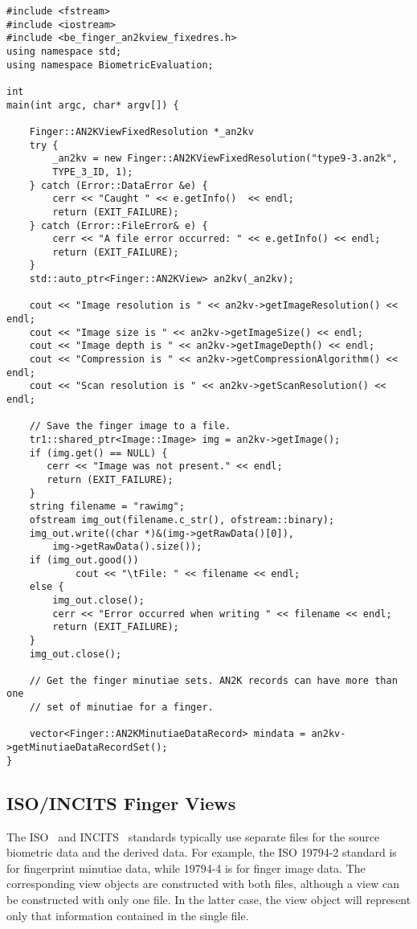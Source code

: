 \begin{lstlisting}[caption={Using an AN2K Finger View}, label=lst:an2kfingerviewuse]
#include <fstream>
#include <iostream>
#include <be_finger_an2kview_fixedres.h>
using namespace std;
using namespace BiometricEvaluation;

int
main(int argc, char* argv[]) {

    Finger::AN2KViewFixedResolution *_an2kv
    try {
        _an2kv = new Finger::AN2KViewFixedResolution("type9-3.an2k",
	    TYPE_3_ID, 1);
    } catch (Error::DataError &e) {
        cerr << "Caught " << e.getInfo()  << endl;
        return (EXIT_FAILURE);
    } catch (Error::FileError& e) {
        cerr << "A file error occurred: " << e.getInfo() << endl;
        return (EXIT_FAILURE);
    }
    std::auto_ptr<Finger::AN2KView> an2kv(_an2kv);

    cout << "Image resolution is " << an2kv->getImageResolution() << endl;
    cout << "Image size is " << an2kv->getImageSize() << endl;
    cout << "Image depth is " << an2kv->getImageDepth() << endl;
    cout << "Compression is " << an2kv->getCompressionAlgorithm() << endl;
    cout << "Scan resolution is " << an2kv->getScanResolution() << endl;

    // Save the finger image to a file.
    tr1::shared_ptr<Image::Image> img = an2kv->getImage();
    if (img.get() == NULL) {
       cerr << "Image was not present." << endl;
       return (EXIT_FAILURE);
    }
    string filename = "rawimg";
    ofstream img_out(filename.c_str(), ofstream::binary);
    img_out.write((char *)&(img->getRawData()[0]),
        img->getRawData().size());
    if (img_out.good())
            cout << "\tFile: " << filename << endl;
    else {
        img_out.close();
        cerr << "Error occurred when writing " << filename << endl;
        return (EXIT_FAILURE);
    }
    img_out.close();

    // Get the finger minutiae sets. AN2K records can have more than one
    // set of minutiae for a finger.

    vector<Finger::AN2KMinutiaeDataRecord> mindata = an2kv->getMinutiaeDataRecordSet();
}
\end{lstlisting}

\subsection{ISO/INCITS Finger Views}

The ISO~\cite{org:iso:sc37} and INCITS~\cite{org:incits} standards typically use
separate files for the source biometric data and the derived data. For example,
the ISO 19794-2 standard is for fingerprint minutiae data, while 19794-4 is for
finger image data. The corresponding \sname view objects are constructed with
both files, although a view can be constructed with only one file. In the
latter case, the view object will represent only that information contained in
the single file.

